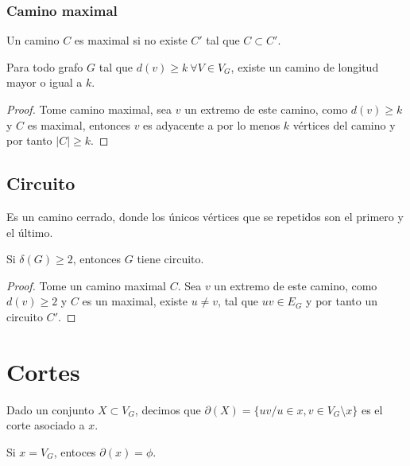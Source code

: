 \subsubsection{Camino maximal}
Un camino $C$ es maximal si no existe $C'$ tal que $C\subset C'$.


\begin{teorema}
Para todo grafo $G$ tal que $d(v)\geq k\ \forall V\in V_G$, existe un camino de longitud mayor o igual a $k$.\\
\end{teorema}
\begin{proof}
Tome camino maximal, sea $v$ un extremo de este camino, como $d(v)\geq k$ y $C$ es maximal, entonces $v$ es adyacente a por lo menos $k$ vértices del camino y por tanto $|C|\geq k$.


\end{proof}
\subsection{Circuito}
Es un camino cerrado, donde los únicos vértices que se repetidos son el primero y el último.

\begin{teorema}
Si $\delta(G)\geq2$, entonces $G$ tiene circuito.
\end{teorema}
\begin{proof}
Tome un camino maximal $C$. Sea $v$ un extremo de este camino,
como $d(v)\geq2$ y $C$ es un maximal, existe $u\neq v$, tal que $uv\in E_G$ y por tanto un circuito $C'$.
\end{proof}

\section{Cortes}
Dado un conjunto $X\subset V_G$, decimos que $\partial (X)=\{uv /u\in x, v\in V_G \setminus x \}$ es el corte asociado a $x$.


Si $x=V_G$, entoces $\partial (x)=\phi$.


